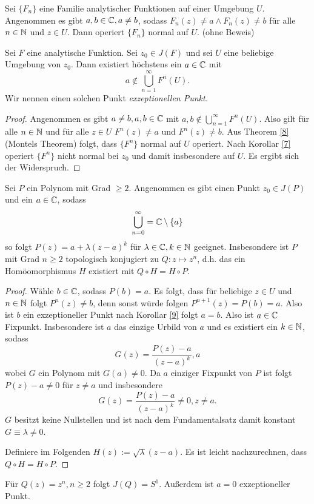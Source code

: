 \documentclass{mywork}
\begin{document}
\begin{thm} \label{8}
Sei $\{F_n\}$ eine Familie analytischer Funktionen auf einer Umgebung $U$. Angenommen es gibt $a,b \in \mathbb{C}, a\neq b$, sodass $F_n(z)\neq a \land F_n(z)\neq b$ für alle $n\in \mathbb{N}$ und $z\in U$. Dann operiert $\{F_n\}$ normal auf $U$. (ohne Beweis) 
\end{thm}

\begin{kor} \label{9}
Sei $F$ eine analytische Funktion. Sei $z_0\in J(F)$ und sei $U$ eine beliebige Umgebung von $z_0$. Dann existiert höchstens ein $a\in \mathbb{C}$ mit
\[
	a\not\in \bigcup_{n=1}^\infty F^n(U).
\]
Wir nennen einen solchen Punkt \emph{exzeptionellen Punkt.}
\end{kor}

\begin{proof}
Angenommen es gibt $a\neq b, a,b \in \mathbb{C}$ mit $a,b \not\in \bigcup_{n=1}^\infty F^n(U)$. Also gilt für alle $n\in \mathbb{N}$ und für alle $z\in U$ $F^n(z)\neq a$ und $F^n(z)\neq b$. Aus Theorem \ref{8} (Montels Theorem) folgt, dass $\{F^n\}$ normal auf $U$ operiert. Nach Korollar \ref{7} operiert $\{F^n\}$ nicht normal bei $z_0$ und damit insbesondere auf $U$. Es ergibt sich der Widerspruch.
\end{proof}

\begin{thm}\label{10}
Sei $P$ ein Polynom mit Grad $\ge 2$. Angenommen es gibt einen Punkt $z_0\in J(P)$ und ein $a\in \mathbb{C}$, sodass 
\[
\bigcup_{n=0}^\infty=\mathbb{C}\setminus\{a\}
\]
so folgt $P(z)=a+\lambda(z-a)^k$ für $\lambda \in \mathbb{C}, k\in \mathbb{N}$ geeignet. 
Insbesondere ist $P$ mit Grad $n\ge 2$ topologisch konjugiert zu $Q: z \mapsto z^n$, d.h. 
das ein Homöomorphismus $H$ existiert mit $Q\circ H=H\circ P$.
\end{thm}

\begin{proof}
Wähle $b\in \mathbb{C}$, sodass $P(b)=a$. Es folgt, dass für beliebige $z\in U$ und $n\in \mathbb{N}$ folgt $P^n(z)\neq b$, denn sonst würde folgen $P^{n+1}(z)=P(b)=a$. Also ist $b$ ein exzeptioneller Punkt nach Korollar \ref{9} folgt $a=b$. Also ist $a\in \mathbb{C}$ Fixpunkt. Insbesondere ist $a$ das einzige Urbild von $a$ und es existiert ein $k\in \mathbb{N}$, sodass
\[
G(z)=\frac{P(z)-a}{(z-a)^k},a
\] 
wobei $G$ ein Polynom mit $G(a)\neq 0$. Da $a$ einziger Fixpunkt von $P$ ist folgt $P(z)-a\neq 0$ für $z\neq a$ und insbesondere 
\[
G(z)=\frac{P(z)-a}{(z-a)^k}\neq 0, z \neq a.
\]
$G$ besitzt keine Nullstellen und ist nach dem Fundamentalsatz damit konstant $G\equiv \lambda\neq 0$.

Definiere im Folgenden $H(z):=\sqrt{\lambda}(z-a)$. Es ist leicht nachzurechnen, dass $Q\circ H=H\circ P$.
\end{proof}
\begin{nt} \label{11}
Für $Q(z)=z^n, n\ge 2$ folgt $J(Q)=S^1$. Außerdem ist $a=0$ exzeptioneller Punkt. 
\end{nt}
\end{document}
